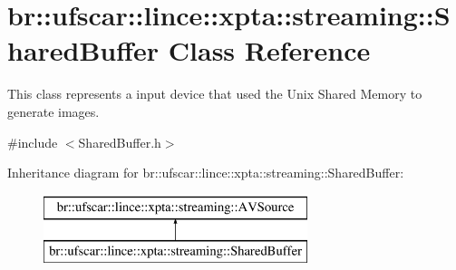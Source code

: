 \hypertarget{classbr_1_1ufscar_1_1lince_1_1xpta_1_1streaming_1_1SharedBuffer}{
\section{br::ufscar::lince::xpta::streaming::SharedBuffer Class Reference}
\label{classbr_1_1ufscar_1_1lince_1_1xpta_1_1streaming_1_1SharedBuffer}
}


This class represents a input device that used the Unix Shared Memory to generate images.  




{\ttfamily \#include $<$SharedBuffer.h$>$}

Inheritance diagram for br::ufscar::lince::xpta::streaming::SharedBuffer:\begin{figure}[H]
\begin{center}
\leavevmode
\includegraphics[height=2cm]{classbr_1_1ufscar_1_1lince_1_1xpta_1_1streaming_1_1SharedBuffer}
\end{center}
\end{figure}
